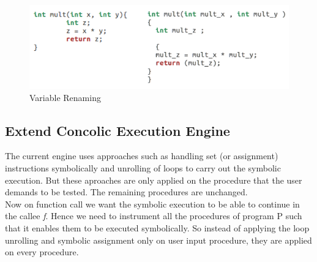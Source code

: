 \documentclass[12pt,oneside]{book}
\begin{document}
\begin{figure}[htbp]
\centering
\includegraphics[scale=0.45]{renamed1.png}
\caption{Variable Renaming}
\end{figure}  

\newpage

\subsection{Extend Concolic Execution Engine}
The current engine uses approaches such as handling set (or assignment) instructions symbolically and unrolling of loops to carry out the symbolic execution. But these aproaches are only applied on the procedure that the user demands to be tested. The remaining procedures are unchanged.\\
Now on function call we want the symbolic execution to be able to continue in the callee \textit{f}. Hence we need to instrument all the procedures of program P such that it enables them to be executed symbolically. So instead of applying the loop unrolling and symbolic assignment only on user input procedure, they are applied on every procedure.

\end{document}
